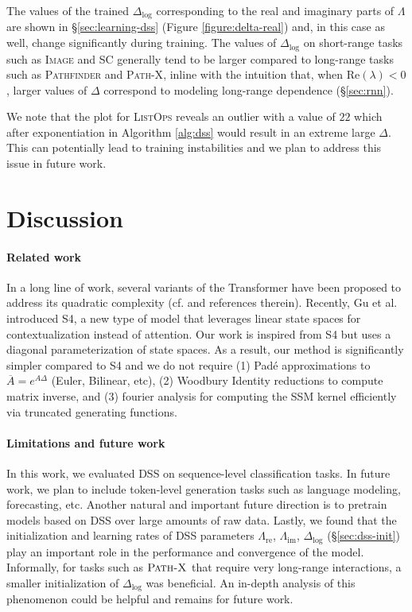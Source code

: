 The values of the trained $\Delta_{\log}$ corresponding to the real and imaginary parts of $\Lambda$ are shown in \S\ref{sec:learning-dss} (Figure \ref{figure:delta-real}) and, in this case as well, change significantly during training. The values of $\Delta_{\log}$ on short-range tasks such as \textsc{Image} and \textsc{SC} generally tend to be larger compared to long-range tasks such as \textsc{Pathfinder} and \textsc{Path-X}, inline with the intuition that, when $\mathrm{Re}(\lambda) < 0$, larger values of $\Delta$ correspond to modeling long-range dependence (\S\ref{sec:rnn}).

We note that the plot for \textsc{ListOps} reveals an outlier with a value of $22$ which after exponentiation in Algorithm \ref{alg:dss} would result in an extreme large $\Delta$. This can potentially lead to training instabilities and we plan to address this issue in future work.

\section{Discussion}\label{sec:discussion}
\paragraph{Related work} 

In a long line of work, several variants of the Transformer have been proposed to address its quadratic complexity (cf. \cite{gupta-berant-2021-value} and references therein). Recently, Gu et al. \cite{gu2022efficiently} introduced S4, a new type of model that leverages linear state spaces for contextualization instead of attention. Our work is inspired from S4 but uses a diagonal parameterization of state spaces. As a result, our method is significantly simpler compared to S4 and we do not require (1) Pad\'{e} approximations to $\overline{A} = e^{A\Delta}$ (Euler, Bilinear, etc), (2) Woodbury Identity reductions to compute matrix inverse, and (3) fourier analysis for computing the SSM kernel efficiently via truncated generating functions.

\paragraph{Limitations and future work} 

In this work, we evaluated DSS on sequence-level classification tasks. In future work, we plan to include token-level generation tasks such as language modeling, forecasting, etc. Another natural and important future direction is to pretrain models based on DSS over large amounts of raw data. Lastly, we found that the initialization and learning rates of DSS parameters $\Lambda_\mathrm{re}$, $\Lambda_\mathrm{im}$, $\Delta_{\log}$ (\S\ref{sec:dss-init}) play an important role in the performance and convergence of the model. Informally, for tasks such as $\textsc{Path-X}$ that require very long-range interactions, a smaller initialization of $\Delta_{\log}$ was beneficial. An in-depth analysis of this phenomenon could be helpful and remains for future work.


